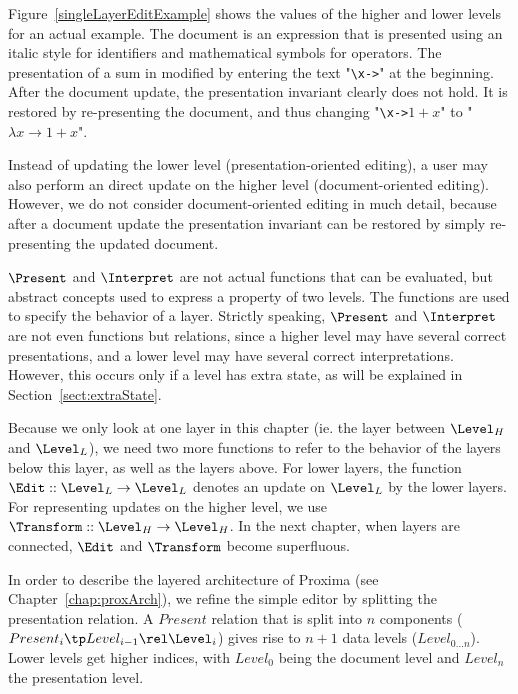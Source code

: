 Figure~\ref{singleLayerEditExample} shows the values of the higher and lower levels for an actual example. The document is an expression that is presented using an italic style for identifiers and mathematical symbols for operators. The presentation of a sum in modified by entering the text "\verb|\x->|" at the beginning. After the document update, the presentation invariant clearly does not hold. It is restored by re-presenting the document, and thus changing "\verb|\x->|$1+x$" to "$\lambda x \to 1+x$".


Instead of updating the lower level (presentation-oriented editing), a user may also perform an direct update on the higher level (document-oriented editing). However, we do not consider document-oriented editing in much detail, because after a document update the presentation invariant can be restored by simply re-presenting the updated document.


\bc
$\Present$ and $\Interpret$ are not actual functions that can be evaluated, but abstract concepts used to express a property of two levels. The functions are used to specify the behavior of a layer.
Strictly speaking, $\Present$ and $\Interpret$ are not even functions but relations, since a higher level may have several correct presentations, and a lower level may have several correct interpretations. However, this occurs only if a level has extra state, as will be explained in Section~\ref{sect:extraState}. \ec

\bc Because we only look at one layer in this chapter (ie. the layer between $\Level_{H}$ and $\Level_{L}$), we need two more functions to refer to the behavior of the layers below this layer, as well as the layers above. For lower layers, the function 
$\Edit :: \Level_{L} \rightarrow \Level_{L}$ denotes an update on $\Level_{L}$ by the lower layers. For representing updates on the higher level, we use 
$\Transform :: \Level_{H} \rightarrow \Level_{H}$. In the next chapter, when layers are connected, $\Edit$ and $\Transform$ become superfluous.\ec



In order to describe the layered architecture of Proxima (see Chapter~\ref{chap:proxArch}), we refine the simple editor by splitting the presentation relation. A $Present$ relation that is split into $n$ components 
($Present_{i} \tp Level_{i-1} \rel \Level_{i}$) gives rise to $n+1$ data levels ($Level_{0 \dots n}$). Lower levels get higher indices, with $Level_{0}$ being the document level and $Level_{n}$ the presentation level. 


